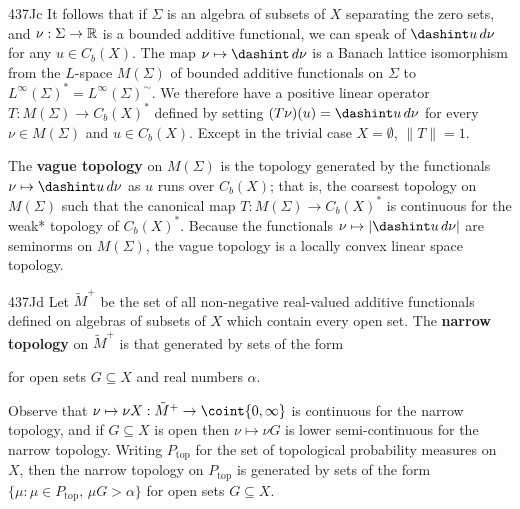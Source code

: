 \spheader 437Jc It follows that if $\Sigma$ is an algebra of subsets of
$X$ separating the zero sets, and $\nu:\Sigma\to\Bbb R$ is a bounded
additive functional, we can speak of $\dashint u\,d\nu$
for any $u\in C_b(X)$.   The map
$\nu\mapsto\dashint\,d\nu$
is a Banach lattice isomorphism from the $L$-space $M(\Sigma)$ of
bounded additive functionals on $\Sigma$ to
$L^{\infty}(\Sigma)^*=L^{\infty}(\Sigma)^{\sim}$.
We therefore have a positive linear operator $T:M(\Sigma)\to C_b(X)^*$
defined by setting $(T\nu)(u)=\dashint u\,d\nu$ for every
$\nu\in M(\Sigma)$ and $u\in C_b(X)$.
Except in the trivial case $X=\emptyset$, $\|T\|=1$.

The {\bf vague topology} on $M(\Sigma)$ is the 
topology generated by
the functionals $\nu\mapsto\dashint u\,d\nu$ as $u$ runs over $C_b(X)$;
that is, the coarsest topology on $M(\Sigma)$ such that the canonical
map $T:M(\Sigma)\to C_b(X)^*$ is
continuous for the weak* topology of $C_b(X)^*$.   Because the
functionals $\nu\mapsto|\dashint u\,d\nu|$ are seminorms on $M(\Sigma)$,
the vague topology is a locally convex linear space topology.

\spheader 437Jd 
Let $\tilde M^+$ be the set of all non-negative real-valued additive
functionals defined on algebras of subsets of $X$ which contain every
open set.
The {\bf narrow topology} on $\tilde M^+$ is that generated by sets of
the form


\noindent for open sets $G\subseteq X$ and real numbers $\alpha$.

Observe that $\nu\mapsto\nu X:\tilde M^+\to\coint{0,\infty}$ is
continuous for the narrow topology, and if
$G\subseteq X$ is open then $\nu\mapsto\nu G$ is lower semi-continuous
for the narrow topology.
Writing $P_{\text{top}}$ for the set of topological probability
measures on $X$, then the narrow topology on $P_{\text{top}}$ is
generated by sets of the form
$\{\mu:\mu\in P_{\text{top}},\,\mu G>\alpha\}$ for open sets
$G\subseteq X$.

